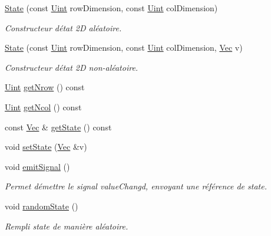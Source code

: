 \begin{DoxyCompactItemize}
\mbox{\hyperlink{class_state_a72792193d86ae159600a31bf40dd3912}{State}} (const \mbox{\hyperlink{state_8h_a4840c4503b7d10cea5e08416eb3716f1}{Uint}} row\+Dimension, const \mbox{\hyperlink{state_8h_a4840c4503b7d10cea5e08416eb3716f1}{Uint}} col\+Dimension)
\begin{DoxyCompactList}\small\item\em Constructeur d\textquotesingle{}état 2D aléatoire. \end{DoxyCompactList}\item 
\mbox{\hyperlink{class_state_a0fd7e27557fffb01934f86ae99720e9e}{State}} (const \mbox{\hyperlink{state_8h_a4840c4503b7d10cea5e08416eb3716f1}{Uint}} row\+Dimension, const \mbox{\hyperlink{state_8h_a4840c4503b7d10cea5e08416eb3716f1}{Uint}} col\+Dimension, \mbox{\hyperlink{state_8h_aa074fbe250e9d18fbe221bb7473158ad}{Vec}} v)
\begin{DoxyCompactList}\small\item\em Constructeur d\textquotesingle{}état 2D non-\/aléatoire. \end{DoxyCompactList}\item 
\mbox{\hyperlink{state_8h_a4840c4503b7d10cea5e08416eb3716f1}{Uint}} \mbox{\hyperlink{class_state_a7897325c49eb83639365bc61d806fab2}{get\+Nrow}} () const
\item 
\mbox{\hyperlink{state_8h_a4840c4503b7d10cea5e08416eb3716f1}{Uint}} \mbox{\hyperlink{class_state_a706098b5c48bcf68bfb3a8676bb5a868}{get\+Ncol}} () const
\item 
const \mbox{\hyperlink{state_8h_aa074fbe250e9d18fbe221bb7473158ad}{Vec}} \& \mbox{\hyperlink{class_state_aa2168c5a262b6bce4cbadc069d72d1be}{get\+State}} () const
\item 
void \mbox{\hyperlink{class_state_ad3c992e4b6e2e857f8f261575d37c3c4}{set\+State}} (\mbox{\hyperlink{state_8h_aa074fbe250e9d18fbe221bb7473158ad}{Vec}} \&v)
\item 
void \mbox{\hyperlink{class_state_a7f9db12892f20438c4e00796e28a0dac}{emit\+Signal}} ()
\begin{DoxyCompactList}\small\item\em Permet d\textquotesingle{}émettre le signal value\+Changd, envoyant une référence de state. \end{DoxyCompactList}\item 
void \mbox{\hyperlink{class_state_ae51e526916dea6aa33f0dbd4529f877b}{random\+State}} ()
\begin{DoxyCompactList}\small\item\em Rempli state de manière aléatoire. \end{DoxyCompactList}\item 

\end{DoxyCompactItemize}
